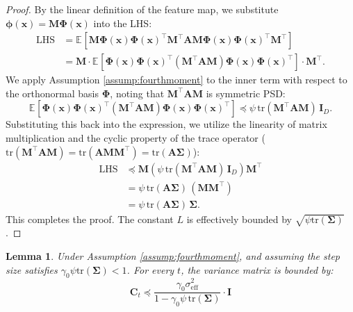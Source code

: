 \documentclass{article}
\theoremstyle{definition}
\theoremstyle{definition}
\theoremstyle{plain}
\theoremstyle{plain}
\theoremstyle{plain}
\newtheorem{lemma}{Lemma}
\theoremstyle{plain}
\theoremstyle{plain}
\newcommand{\bs}[1]{\boldsymbol{\mathbf{#1}}}
\newcommand{\tr}{\mathrm{tr}}
\newcommand{\vecx}{\mathbf{x}}
\newcommand{\eff}{\mathrm{eff}}
\newcommand{\id}{\mathbf{I}}
\newcommand{\ex}[2][]{\mathbb{E}_{#1}\left[ #2 \right]}
\begin{document}
\begin{proof}
    By the linear definition of the feature map, we substitute $\bs\phi(\vecx) = \bs M \bs\Phi(\vecx)$ into the LHS:
    \begin{equation}
    \begin{aligned}
        \text{LHS} &= \ex{\bs M\bs\Phi(\vecx)\bs\Phi(\vecx)^\top \bs M^\top \bs A \bs M \bs\Phi(\vecx)\bs\Phi(\vecx)^\top \bs M^\top} \\
        &= \bs M \cdot \ex{\bs\Phi(\vecx)\bs\Phi(\vecx)^\top (\bs M^\top \bs A \bs M) \bs\Phi(\vecx)\bs\Phi(\vecx)^\top} \cdot \bs M^\top.
    \end{aligned}
    \end{equation}
    We apply Assumption \ref{assump:fourthmoment} to the inner term with respect to the orthonormal basis $\bs\Phi$, noting that $\bs M^\top \bs A \bs M$ is symmetric PSD:
    \begin{equation}
        \ex{\bs\Phi(\vecx)\bs\Phi(\vecx)^\top (\bs M^\top \bs A \bs M) \bs\Phi(\vecx)\bs\Phi(\vecx)^\top} \preceq \psi \, \tr(\bs M^\top \bs A \bs M) \, \bs I_D.
    \end{equation}
    Substituting this back into the expression, we utilize the linearity of matrix multiplication and the cyclic property of the trace operator ($\tr(\bs M^\top \bs A \bs M) = \tr(\bs A \bs M \bs M^\top) = \tr(\bs A \bs\Sigma)$):
    \begin{equation}
    \begin{aligned}
        \text{LHS} &\preceq \bs M \left( \psi \, \tr(\bs M^\top \bs A \bs M) \, \bs I_D \right) \bs M^\top \\
        &= \psi \, \tr(\bs A \bs\Sigma) \, (\bs M \bs M^\top)\\
        &= \psi \, \tr(\bs A \bs\Sigma) \, \bs\Sigma.
    \end{aligned}
    \end{equation}
    This completes the proof. The constant $L$ is effectively bounded by $\sqrt{\psi \tr(\bs\Sigma)}$.
\end{proof}


\begin{lemma}\label{varmatupbound}
    Under Assumption \ref{assump:fourthmoment}, and assuming the step size satisfies $\gamma_0 \psi \tr(\bs \Sigma) < 1$. For every $t$, the variance matrix is bounded by:
    \begin{equation}
        \bs C_t \preceq \frac{\gamma_0\sigma_\eff^2}{1-\gamma_0 \psi\,\tr(\bs \Sigma)}\cdot \id
    \end{equation}
\end{lemma}
\end{document}

